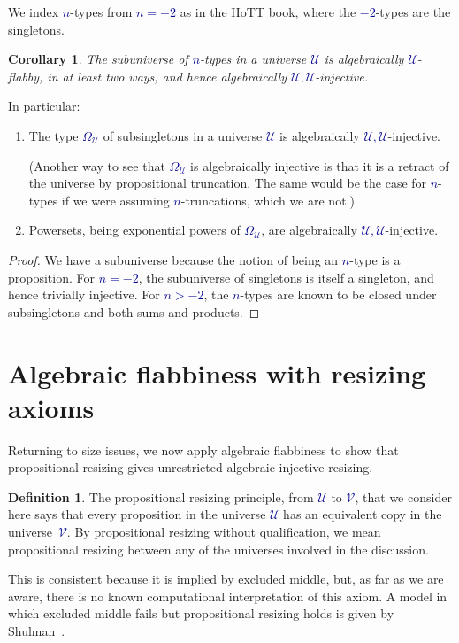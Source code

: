 \documentclass[10pt]{article}
\newcommand{\db}{\textcolor{darkblue}}
\newcommand{\m}[1]{\db{$#1$}}
\newcommand{\U}{\mathcal{U}}
\newcommand{\V}{\mathcal{V}}
\newtheorem{corollary}[numbered]{Corollary}
\theoremstyle{definition}
\newtheorem{definition}[numbered]{Definition}
\begin{document}
We index \m{n}-types from \m{n=-2} as in the HoTT book, where the
\m{-2}-types are the singletons.
\begin{corollary}
  The subuniverse of \m{n}-types in a universe \m{\U} is algebraically
  \m{\U}-flabby, in at least two ways, and hence algebraically
  \m{\U,\U}-injective.
\end{corollary}
\noindent In particular:
\begin{enumerate}
\item The type \m{\Omega_\U} of subsingletons in a universe \m{\U} is
  algebraically \m{\U,\U}-injective.

  (Another way to see that \m{\Omega_\U} is algebraically injective is
  that it is a retract of the universe by propositional
  truncation. The same would be the case for \m{n}-types if we were
  assuming \m{n}-truncations, which we are not.)

\item Powersets, being exponential powers of \m{\Omega_\U}, are
  algebraically \m{\U,\U}-injective.
\end{enumerate}
\begin{proof}
  We have a subuniverse because the notion of being an \m{n}-type is a
  proposition. For \m{n=-2}, the subuniverse of singletons is itself a
  singleton, and hence trivially injective.  For \m{n>-2}, the
  \m{n}-types are known to be closed under subsingletons and both sums
  and products.
\end{proof}

\section{Algebraic flabbiness with resizing axioms}

Returning to size issues, we now apply algebraic flabbiness to show
that propositional resizing gives unrestricted algebraic injective
resizing.
\begin{definition} \label{resizing}
The propositional resizing principle, from \m{\U} to \m{\V}, that we
consider here says that every proposition in the universe \m{\U} has
an equivalent copy in the universe~\m{\V}. By propositional resizing without
qualification, we mean propositional resizing between any of the
universes involved in the discussion.
\end{definition}
This is consistent because
it is implied by excluded middle, but, as far as we are aware, there
is no known computational interpretation of this axiom. A model in
which excluded middle fails but propositional resizing holds is given
by Shulman~\cite{MR3340541}.
\end{document}
